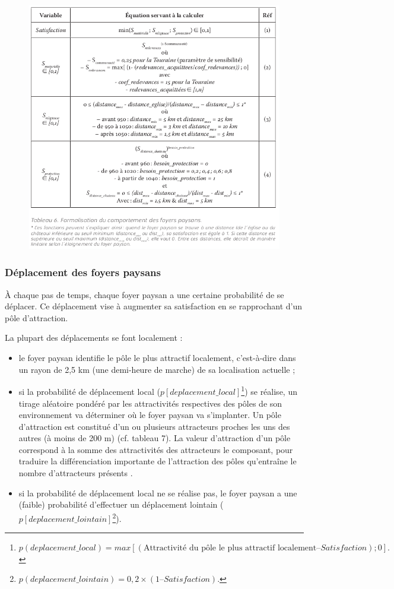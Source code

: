 \documentclass[12pt, a4paper, oneside]{book}
\begin{document}
\begin{figure}[H]
	\centering
	\includegraphics[width=1\linewidth]{src/Chapitre_TMD/Tab6.png}
\end{figure}

	\subsubsection{Déplacement des foyers paysans}
	
	À chaque pas de temps, chaque foyer paysan a une certaine probabilité de se déplacer.
	Ce déplacement vise à augmenter sa satisfaction en se rapprochant d'un pôle d'attraction.
	
	La plupart des déplacements se font localement :
	\begin{itemize}
		\item le foyer paysan identifie le pôle le plus attractif localement, c'est-à-dire dans un rayon de 2,5 km (une demi-heure de marche) de sa localisation actuelle ;
		\item si la probabilité de déplacement local ($p[deplacement\_local]$\footnote{
	$p(deplacement\_local) = max[(\text{Attractivité du pôle le plus attractif localement} – Satisfaction) ; 0].$	
	}) se réalise, un tirage aléatoire pondéré par les attractivités respectives des pôles de son environnement va déterminer où le foyer paysan va s'implanter.
		Un pôle d'attraction est constitué d'un ou plusieurs attracteurs proches les uns des autres (à moins de 200 m) (cf. tableau 7).
		La valeur d'attraction d'un pôle correspond à la somme des attractivités des attracteurs le composant, pour traduire la différenciation importante de l'attraction des pôles qu'entraîne le nombre d'attracteurs présents \autocite[tableau 13, p. 96]{zadora-rio_paroisses_2008}.
		\item si la probabilité de déplacement local ne se réalise pas, le foyer paysan a une (faible) probabilité d'effectuer un déplacement lointain ($p[deplacement\_lointain]$\footnote{
		$p(deplacement\_lointain) = 0,2 × (1 – Satisfaction)$.
	}).
	\end{itemize}
\end{document}
